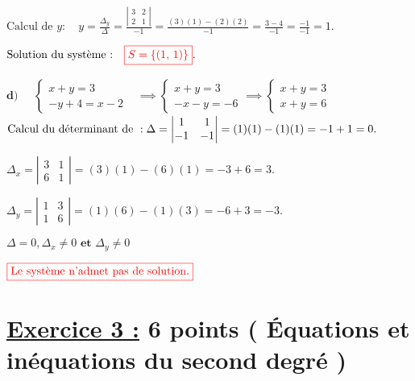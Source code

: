 \documentclass[12pt,a4paper]{article}
\begin{document}
\(
\text{Calcul de } y : \quad
y = \frac{\Delta_{y}}{\Delta} = \frac{\left| \begin{matrix} 3 & 2 \\ 2 & 1 \end{matrix} \right|}{-1}
= \frac{(3)(1) - (2)(2)}{-1} = \frac{3 - 4}{-1} = \frac{-1}{-1} = 1.
\)

\(
\text{Solution du système :} \quad
\textcolor{red}{\boxed{S=\left\lbrace  \left( 1, \, 1 \right)  \right\rbrace }}.
\)

\(\textbf{d)} \quad
\begin{aligned}
\begin{cases}
x + y = 3 \\
-y + 4 = x - 2
\end{cases}&\implies
\begin{cases}
x + y = 3 \\
-x-y  = - 6
\end{cases}\implies
\begin{cases}
x + y = 3 \\
x+y  =  6
\end{cases}
\end{aligned}
\)\\

\(
\text{Calcul du déterminant de }: \\
\Delta = \left| \begin{matrix} 1 & 1 \\ -1 & -1 \end{matrix} \right| = (1)(1) - (1)(1) = -1 + 1 = 0.
\)

\(
\Delta_{x} = \left| \begin{matrix} 3 & 1 \\ 6 & 1 \end{matrix} \right| = (3)(1) - (6)(1) = -3 + 6 = 3.
\)

\(
\Delta_{y} = \left| \begin{matrix} 1 & 3 \\ 1 & 6 \end{matrix} \right| = (1)(6) - (1)(3) = -6 + 3 = -3.
\)

\(
\Delta=0, \Delta_{x}\neq 0 \textbf{ et } \Delta_{y}\neq 0
\)

\(
\textcolor{red}{\boxed{\text{Le système n'admet pas de solution.}}}
\)

\section*{\underline{Exercice 3 :} 6 points ( Équations et inéquations du second degré )}
\end{document}
